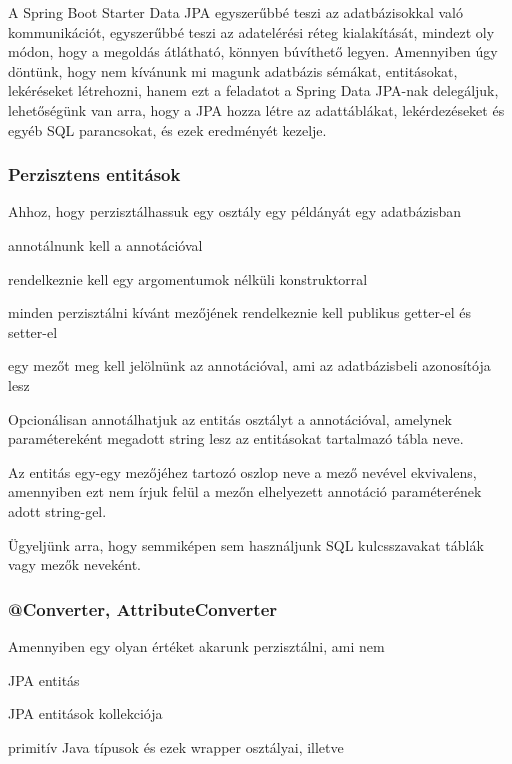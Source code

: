 A Spring Boot Starter Data JPA egyszerűbbé teszi az adatbázisokkal való kommunikációt, egyszerűbbé teszi az adatelérési réteg kialakítását, mindezt oly módon, hogy a megoldás átlátható, könnyen búvíthető legyen. Amennyiben úgy döntünk, hogy nem kívánunk mi magunk adatbázis sémákat, entitásokat, lekéréseket létrehozni, hanem ezt a feladatot a Spring Data JPA-nak delegáljuk, lehetőségünk van arra, hogy a JPA hozza létre az adattáblákat, lekérdezéseket és egyéb SQL parancsokat, és ezek eredményét kezelje.

\subsubsection{Perzisztens entitások}

Ahhoz, hogy perzisztálhassuk egy osztály egy példányát egy adatbázisban 

\begin{listing}
	\item annotálnunk kell a  annotációval
	\item rendelkeznie kell egy argomentumok nélküli konstruktorral
	\item minden perzisztálni kívánt mezőjének rendelkeznie kell publikus getter-el és setter-el
	\item egy mezőt meg kell jelölnünk az  annotációval, ami az adatbázisbeli azonosítója lesz
\end{listing}

Opcionálisan annotálhatjuk az entitás osztályt a  annotációval, amelynek  paramétereként megadott string lesz az entitásokat tartalmazó tábla neve. \par

Az entitás egy-egy mezőjéhez tartozó oszlop neve a mező nevével ekvivalens, amennyiben ezt nem írjuk felül a mezőn elhelyezett  annotáció  paraméterének adott string-gel. \par

Ügyeljünk arra, hogy semmiképen sem használjunk SQL kulcsszavakat táblák vagy mezők neveként.

\subsubsection{@Converter, AttributeConverter}

Amennyiben egy olyan értéket akarunk perzisztálni, ami nem

\begin{listing}
	\item JPA entitás
	\item JPA entitások kollekciója
	\item primitív Java típusok és ezek wrapper osztályai, illetve 
\end{listing}

